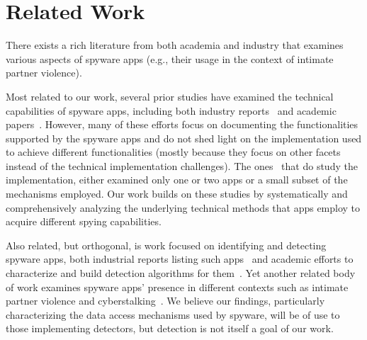 \documentclass[sigconf,balance=false]{acmart}
\begin{document}
\section{Related Work}
\label{sec:related_work}
There exists a rich literature from both academia and industry that
examines various aspects of spyware apps (e.g., their usage in the
context of intimate partner violence).

Most related to our work, several prior studies have examined
the technical capabilities of spyware apps, including
both industry reports~\cite{PowerPoi79:online, SpyvsSpy59:online,
  ANewWave1:online, Whyyoush17:online, ReverseE12:online,
  YourInfo19:online, Stalking85:online, FlexSpyA1:online,
  diskurse89:online, VB2019Za6:online, SpywareP46:online, Androida91:online} and academic
papers~\cite{parsons2019predator, harkin2019consumer,
  harkin2020commodification, pierazzi2020data,
  feal2020angel,harkin2021operating}. However, many of these
efforts focus on documenting the functionalities supported by the
spyware apps and do not shed light on the implementation used to achieve
different functionalities (mostly because they focus on other facets instead
of the technical implementation challenges). The ones~\cite{Whyyoush17:online,ReverseE12:online,Stalking85:online,FlexSpyA1:online,diskurse89:online,VB2019Za6:online,parsons2019predator} that do study the implementation,
either examined only one or two apps or a small subset of the
mechanisms employed. Our work builds on these studies by systematically and comprehensively analyzing the underlying technical methods that apps employ to acquire different spying capabilities.

Also related, but orthogonal, is work focused on identifying and
detecting spyware apps, both industrial reports listing such
apps~\cite{Tekstalk86:online, esetandr4:online, ch33r10S37:online} and
academic efforts to characterize and build detection algorithms for
them~\cite{almansoori2022global,pierazzi2020data, chatterjee2018spyware, han2021towards,
  saroiu2004measurement, egele2007dynamic, roundy2020many,
  wang2006netspy, moshchuk2006crawler, randall2020trufflehunter}.  Yet
another related body of work examines spyware apps' presence in
different contexts such as intimate partner violence and
cyberstalking~\cite{havron2019clinical,freed2019my,tseng2020tools,thomas2021sok,freed2018stalker,fraser2010new,
  shimizu2013domestic,woodlock2017abuse,southworth2005high,southworth2006technology,dragiewicz2019domestic,mayrhofer2021android,motherboardstalkerwaremarket}.
We believe our findings, particularly characterizing the data access
mechanisms used by spyware, will be of use to those implementing
detectors, but detection is not itself a goal of our work.
\end{document}
